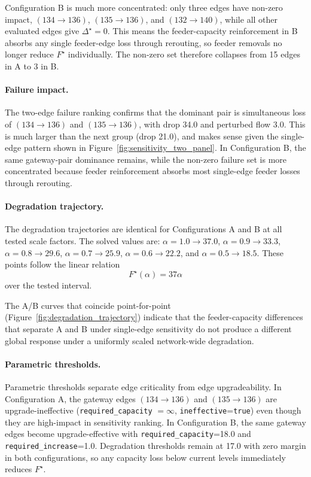 \documentclass[12pt]{report}
\begin{document}
Configuration B is much more concentrated: only three edges have non-zero impact, $(134\to136)$, $(135\to136)$, and $(132\to140)$, while all other evaluated edges give $\Delta^\star=0$. This means the feeder-capacity reinforcement in B absorbs any single feeder-edge loss through rerouting, so feeder removals no longer reduce $F^\star$ individually. The non-zero set therefore collapses from 15 edges in A to 3 in B.

\paragraph{Failure impact.}
The two-edge failure ranking confirms that the dominant pair is simultaneous loss of $(134\to136)$ and $(135\to136)$, with drop 34.0 and perturbed flow 3.0. This is much larger than the next group (drop 21.0), and makes sense given the single-edge pattern shown in Figure~\ref{fig:sensitivity_two_panel}. In Configuration B, the same gateway-pair dominance remains, while the non-zero failure set is more concentrated because feeder reinforcement absorbs most single-edge feeder losses through rerouting.

\paragraph{Degradation trajectory.}
The degradation trajectories are identical for Configurations A and B at all tested scale factors. The solved values are: $\alpha=1.0 \rightarrow 37.0$, $\alpha=0.9 \rightarrow 33.3$, $\alpha=0.8 \rightarrow 29.6$, $\alpha=0.7 \rightarrow 25.9$, $\alpha=0.6 \rightarrow 22.2$, and $\alpha=0.5 \rightarrow 18.5$. These points follow the linear relation
\[
F^\star(\alpha)=37\alpha
\]
over the tested interval.

The A/B curves that coincide point-for-point (Figure~\ref{fig:degradation_trajectory}) indicate that the feeder-capacity differences that separate A and B under single-edge sensitivity do not produce a different global response under a uniformly scaled network-wide degradation.

\paragraph{Parametric thresholds.}
Parametric thresholds separate edge criticality from edge upgradeability. In Configuration A, the gateway edges $(134\to136)$ and $(135\to136)$ are upgrade-ineffective (\texttt{required\_capacity} $=\infty$, \texttt{ineffective}=\texttt{true}) even though they are high-impact in sensitivity ranking. In Configuration B, the same gateway edges become upgrade-effective with \texttt{required\_capacity}=18.0 and \texttt{required\_increase}=1.0. Degradation thresholds remain at 17.0 with zero margin in both configurations, so any capacity loss below current levels immediately reduces $F^\star$.
\end{document}
